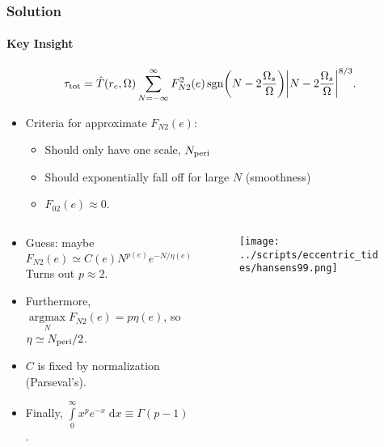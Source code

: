 \documentclass[dvipsnames,8pt]{beamer}
\DeclareMathOperator*{\argmax}{argmax}
\DeclareMathOperator{\sgn}{sgn}
\DeclarePairedDelimiter\abs{\lvert}{\rvert}
\DeclarePairedDelimiter\p{\lparen}{\rparen}
\begin{document}
\begin{frame}
    \frametitle{Solution}
    \framesubtitle{Key Insight}
    \begin{equation*}
        \tau_{\rm tot} = \hat{T}(r_c, \Omega)
            \sum\limits_{N = -\infty}^\infty F_{N2}^2(e)
                \sgn\p*{N - 2\frac{\Omega_s}{\Omega}}
                \abs*{N - 2\frac{\Omega_s}{\Omega}}^{8/3}.
    \end{equation*}

    \begin{itemize}
        \item Criteria for approximate $F_{N2}(e)$:
        \begin{itemize}
            \item Should only have one scale, $N_{\rm peri}$
            \item Should exponentially fall off for large $N$ (smoothness)
            \item $F_{02}(e) \approx 0$.
        \end{itemize}

    \end{itemize}

    \begin{columns}
        \begin{column}{0.5\textwidth}
            \begin{itemize}
                \item Guess: maybe
                    \begin{equation}
                        F_{N2}(e) \simeq C(e) N^{p(e)} e^{-N / \eta(e)}.
                    \end{equation}
                    Turns out $p \approx 2$.

                \item Furthermore, $\argmax\limits_N F_{N2}(e) =
                    p\eta(e)$, so $\eta \simeq N_{\rm peri} / 2$.

                \item $C$ is fixed by normalization (Parseval's).

                \item Finally, $\int\limits_0^\infty x^pe^{-x}\;\mathrm{d}x
                    \equiv \Gamma(p - 1)$.
            \end{itemize}
        \end{column}
        \begin{column}{0.5\textwidth}
            \begin{figure}[h]
                \centering
                \texttt{[image: ../scripts/eccentric\_tides/hansens99.png]}
            \end{figure}
        \end{column}
    \end{columns}
\end{frame}
\end{document}
